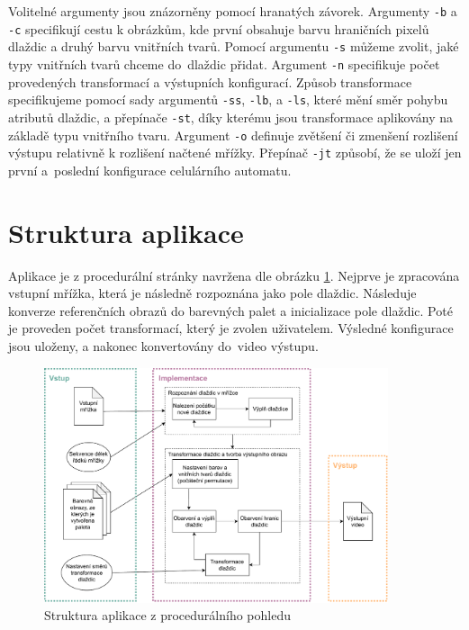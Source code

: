 Volitelné argumenty jsou znázorněny pomocí hranatých závorek. Argumenty  \verb|-b| a \verb|-c| specifikují cestu k obrázkům, kde první obsahuje barvu hraničních pixelů dlaždic a druhý barvu vnitřních tvarů. Pomocí argumentu \verb|-s| můžeme zvolit, jaké typy vnitřních tvarů chceme do~dlaždic přidat. Argument \verb|-n| specifikuje počet provedených transformací a výstupních konfigurací. Způsob transformace specifikujeme pomocí sady argumentů \verb|-ss|, \verb|-lb|, a \verb|-ls|, které mění směr pohybu atributů dlaždic, a přepínače \verb|-st|, díky kterému jsou transformace aplikovány na základě typu vnitřního tvaru. Argument \verb|-o| definuje zvětšení či zmenšení rozlišení výstupu relativně k rozlišení načtené mřížky. Přepínač \verb|-jt| způsobí, že se uloží jen první a~poslední konfigurace celulárního automatu.

\section{Struktura aplikace}

Aplikace je z procedurální stránky navržena dle obrázku \ref{fig:Structure}. Nejprve je zpracována vstupní mřížka, která je následně rozpoznána jako pole dlaždic. Následuje konverze referenčních obrazů do barevných palet a inicializace pole dlaždic. Poté je proveden počet transformací, který je zvolen uživatelem. Výsledné konfigurace jsou uloženy, a nakonec konvertovány do~video výstupu.

\begin{figure}[H]
    \centering
    \includegraphics[width=0.9\textwidth]{obrazky-figures/StrukturaAplikace.pdf}
    \caption{Struktura aplikace z procedurálního pohledu}
    \label{fig:Structure}
\end{figure}

